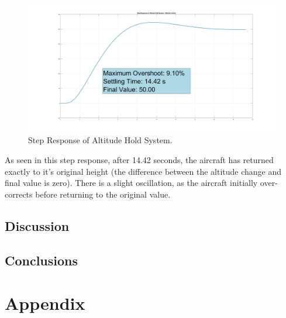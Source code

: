 \documentclass[stu, a4paper, 12pt, floatsintext]{apa7}
\numberwithin{figure}{section}
\numberwithin{table}{section}
\numberwithin{equation}{section}
\begin{document}
\begin{figure}[H]
    \caption{Step Response of Altitude Hold System.}
    \label{fig:task17_result}
    \centering
    \includegraphics[width=1.0\textwidth]{pictures/Auotpilot/Task17.jpg}
\end{figure}
As seen in this step response, after 14.42 seconds, the aircraft has returned exactly to it's original height (the difference between the altitude change and final value is zero). There is a slight oscillation, as the aircraft initially over-corrects before returning to the original value. 
\subsection{Discussion}
\subsection{Conclusions}

\newpage
\section{Appendix}
\listoffigures
\listoftables
\listofmyequations

\newpage

\printbibliography
\end{document}
